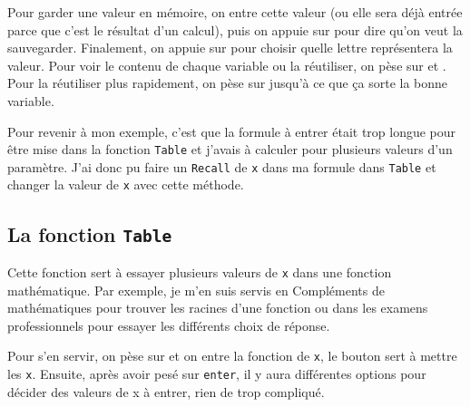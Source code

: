 Pour garder une valeur en mémoire, on entre cette valeur (ou elle sera déjà entrée parce que c'est le résultat d'un calcul), puis on appuie sur  pour dire qu'on veut la sauvegarder. Finalement, on appuie sur  pour choisir quelle lettre représentera la valeur. Pour voir le contenu de chaque variable ou la réutiliser, on pèse sur  et . Pour la réutiliser plus rapidement, on pèse sur  jusqu'à ce que ça sorte la bonne variable.

Pour revenir à mon exemple, c'est que la formule à entrer était trop longue pour être mise dans la fonction \texttt{Table} et j'avais à calculer pour plusieurs valeurs d'un paramètre. J'ai donc pu faire un \texttt{Recall} de \texttt{x} dans ma formule dans \texttt{Table} et changer la valeur de \texttt{x} avec cette méthode.

\subsection{La fonction \texttt{Table}}
Cette fonction sert à essayer plusieurs valeurs de \texttt{x} dans une fonction mathématique. Par exemple, je m'en suis servis en Compléments de mathématiques pour trouver les racines d'une fonction ou dans les examens professionnels pour essayer les différents choix de réponse. 

Pour s'en servir, on pèse sur  et on entre la fonction de \texttt{x}, le bouton  sert à mettre les \texttt{x}. Ensuite, après avoir pesé sur \texttt{enter}, il y aura différentes options pour décider des valeurs de x à entrer, rien de trop compliqué.

